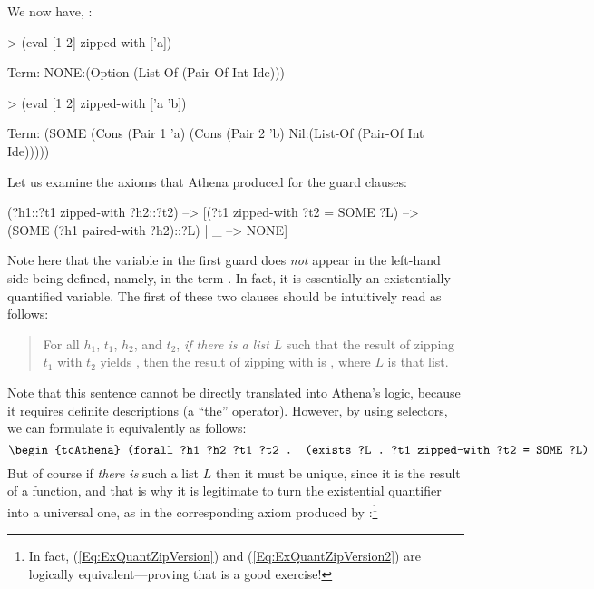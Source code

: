 We now have, \egnsp:
\begin{tcAthena}
> (eval [1 2] zipped-with ['a])

Term: NONE:(Option (List-Of (Pair-Of Int Ide)))

> (eval [1 2] zipped-with ['a 'b])

Term: (SOME (Cons (Pair 1 'a)
                  (Cons (Pair 2 'b)
                        Nil:(List-Of (Pair-Of Int Ide)))))
\end{tcAthena}

Let us examine the axioms that Athena produced for the guard clauses:
\begin{tcAthena}
(?h1::?t1 zipped-with ?h2::?t2) -->
    [(?t1 zipped-with ?t2 = SOME ?L) --> (SOME (?h1 paired-with ?h2)::?L)
    | _ --> NONE]
\end{tcAthena}
Note here that the variable  in the first guard does {\em not\/}
appear in the left-hand side being defined, namely, in the term
. In fact, it is essentially an existentially
quantified variable. The first of these two clauses should be intuitively read as follows:
\begin{quote}
For all $h_1$, $t_1$, $h_2$, and $t_2$, {\em if there is a list\/} $L$
such that the result of zipping $t_1$ with $t_2$ yields , 
then the result of zipping  with  
is , where $L$ is that 
list.
\end{quote}
Note that this sentence cannot be directly translated
into Athena's logic, because it requires definite descriptions (a ``the''
operator). However, by using selectors, we can formulate it equivalently 
as follows:
\begin{equation}
\begin{minipage}{5in}
\begin{tcAthena}
(forall ?h1 ?h2 ?t1 ?t2 . 
    (exists ?L . ?t1 zipped-with ?t2 = SOME ?L) ==> 
        ?h1::?t1 zipped-with ?h2::?t2 = SOME option-val ?t1 zipped-with ?t2)
\end{tcAthena}
\end{minipage}
\label{Eq:ExQuantZipVersion}
\end{equation}
But of course if {\em there is\/} such a list $L$ then it must be unique,
since it is the result of a function, and that is why it is legitimate
to turn the existential quantifier into a universal one, as in the
corresponding axiom produced by :\footnote{In fact, (\ref{Eq:ExQuantZipVersion})
and (\ref{Eq:ExQuantZipVersion2}) are logically equivalent---proving that is a good exercise!}
